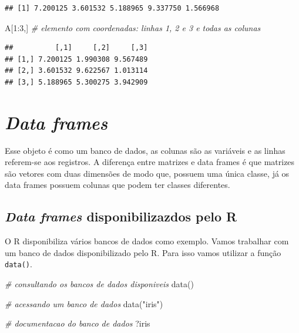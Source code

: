 \documentclass[
]{book}
\newenvironment{Shaded}{\begin{snugshade}}{\end{snugshade}}
\newcommand{\CommentTok}[1]{\textcolor[rgb]{0.56,0.35,0.01}{\textit{#1}}}
\newcommand{\DecValTok}[1]{\textcolor[rgb]{0.00,0.00,0.81}{#1}}
\newcommand{\FunctionTok}[1]{\textcolor[rgb]{0.00,0.00,0.00}{#1}}
\newcommand{\NormalTok}[1]{#1}
\newcommand{\SpecialCharTok}[1]{\textcolor[rgb]{0.00,0.00,0.00}{#1}}
\newcommand{\StringTok}[1]{\textcolor[rgb]{0.31,0.60,0.02}{#1}}
\begin{document}
\begin{verbatim}
## [1] 7.200125 3.601532 5.188965 9.337750 1.566968
\end{verbatim}

\begin{Shaded}
\begin{Highlighting}[]
\NormalTok{A[}\DecValTok{1}\SpecialCharTok{:}\DecValTok{3}\NormalTok{,] }\CommentTok{\# elemento com coordenadas: linhas 1, 2 e 3 e todas as colunas}
\end{Highlighting}
\end{Shaded}

\begin{verbatim}
##          [,1]     [,2]     [,3]
## [1,] 7.200125 1.990308 9.567489
## [2,] 3.601532 9.622567 1.013114
## [3,] 5.188965 5.300275 3.942909
\end{verbatim}

\hypertarget{data-frames}{%
\section{\texorpdfstring{\emph{Data frames}}{Data frames}}\label{data-frames}}

Esse objeto é como um banco de dados, as colunas são as variáveis e as linhas referem-se aos registros. A diferença entre matrizes e data frames é que matrizes são vetores com duas dimensões de modo que, possuem uma única classe, já os data frames possuem colunas que podem ter classes diferentes.

\hypertarget{data-frames-disponibilizazdos-pelo-r}{%
\subsection{\texorpdfstring{\emph{Data frames} disponibilizazdos pelo R}{Data frames disponibilizazdos pelo R}}\label{data-frames-disponibilizazdos-pelo-r}}

O R disponibiliza vários bancos de dados como exemplo. Vamos trabalhar com um banco de dados disponibilizado pelo R. Para isso vamos utilizar a função \texttt{data()}.

\begin{Shaded}
\begin{Highlighting}[]
\CommentTok{\# consultando os bancos de dados disponiveis}
\FunctionTok{data}\NormalTok{()}

\CommentTok{\# acessando um banco de dados}
\FunctionTok{data}\NormalTok{(}\StringTok{"iris"}\NormalTok{)}

\CommentTok{\# documentacao do banco de dados}
\NormalTok{?iris}
\end{Highlighting}
\end{Shaded}
\end{document}
